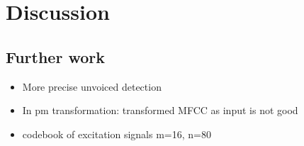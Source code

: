 \chapter{Discussion} %
\label{cha:discussion}

\section{Further work} %
\label{sec:further_work}
\begin{itemize}
	\item More precise unvoiced detection
	\item In pm transformation: transformed MFCC as input is not good
	\item codebook of excitation signals m=16, n=80
\end{itemize}
